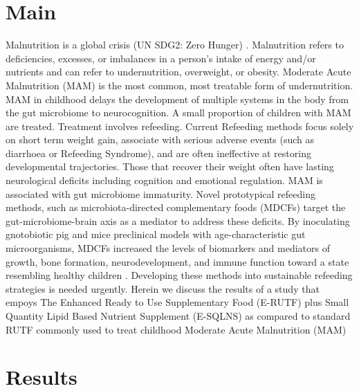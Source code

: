\documentclass{article}
\begin{document}
\section{Main}
Malnutrition is a global crisis (UN SDG2: Zero Hunger) \cite{UN_SDG2}.
Malnutrition refers to deficiencies, excesses, or imbalances in a person’s intake of energy and/or nutrients and can refer to undernutrition, overweight, or obesity.
Moderate Acute Malnutrition (MAM) is the most common, most treatable form of undernutrition.
MAM in childhood delays the development of multiple systems in the body from the gut microbiome to neurocognition.
A small proportion of children with MAM are treated.
Treatment involves refeeding.
Current Refeeding methods focus solely on short term weight gain, associate with serious adverse events (such as diarrhoea or Refeeding Syndrome), and are often ineffective at restoring developmental trajectories.
Those that recover their weight often have lasting neurological deficits including cognition and emotional regulation.
MAM is associated with gut microbiome immaturity.
Novel prototypical refeeding methods, such as microbiota-directed complementary foods (MDCFs) target the gut-microbiome-brain axis as a mediator to address these deficits.
By inoculating gnotobiotic pig and mice preclinical models with age-characteristic gut microorganisms, MDCFs increased the levels of biomarkers and mediators of growth, bone formation, neurodevelopment, and immune function toward a state resembling healthy children \cite{gehrig2019effects}.
Developing these methods into sustainable refeeding strategies is needed urgently.
Herein we discuss the results of a study that empoys The Enhanced Ready to Use Supplementary Food (E-RUTF) plus Small Quantity Lipid Based Nutrient Supplement (E-SQLNS) as compared to standard RUTF commonly used to treat childhood Moderate Acute Malnutrition (MAM) 

\section{Results}
\end{document}
